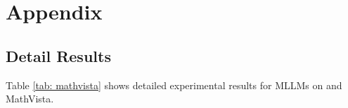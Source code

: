 \section{Appendix}



\subsection{Detail Results}
\label{sec:detail_results}
Table \ref{tab: mathvista} shows detailed experimental results for MLLMs on \benchmark and MathVista.



